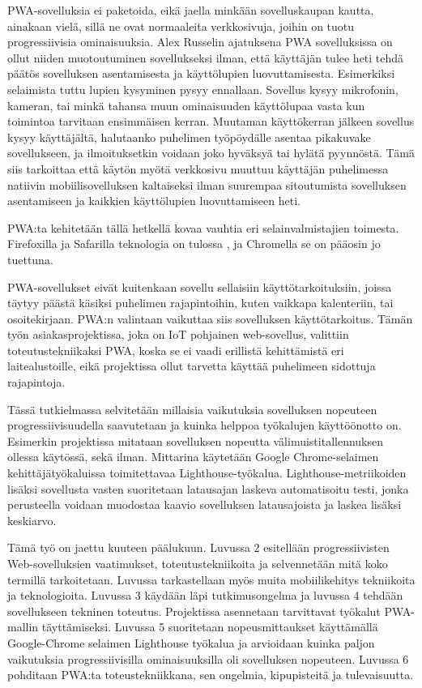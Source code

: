 \documentclass{tktltiki}
\begin{document}
PWA-sovelluksia ei paketoida, eikä jaella minkään sovelluskaupan kautta, ainakaan vielä, sillä ne ovat normaaleita verkkosivuja, joihin on tuotu progressiivisia ominaisuuksia. Alex  Russelin ajatuksena \cite{Russell} PWA sovelluksissa on ollut niiden muotoutuminen sovellukseksi ilman, että käyttäjän tulee heti tehdä päätös sovelluksen asentamisesta ja käyttölupien luovuttamisesta. Esimerkiksi selaimista tuttu lupien kysyminen pysyy ennallaan. Sovellus kysyy mikrofonin, kameran, tai minkä tahansa muun ominaisuuden käyttölupaa vasta kun toimintoa tarvitaan ensimmäisen kerran. Muutaman käyttökerran jälkeen sovellus kysyy käyttäjältä, halutaanko puhelimen työpöydälle asentaa pikakuvake sovellukseen, ja ilmoituksetkin voidaan joko hyväksyä tai hylätä pyynnöstä. Tämä siis tarkoittaa että käytön myötä verkkosivu muuttuu käyttäjän puhelimessa natiivin mobiilisovelluksen kaltaiseksi ilman suurempaa sitoutumista sovelluksen asentamiseen ja kaikkien käyttölupien luovuttamiseen heti. 

PWA:ta kehitetään tällä hetkellä kovaa vauhtia eri selainvalmistajien toimesta. Firefoxilla ja Safarilla teknologia on tulossa \cite{Santoni}, ja Chromella se on pääosin jo tuettuna. 

PWA-sovellukset eivät kuitenkaan sovellu sellaisiin käyttötarkoituksiin, joissa täytyy päästä käsiksi puhelimen rajapintoihin, kuten vaikkapa kalenteriin, tai osoitekirjaan. PWA:n valintaan vaikuttaa siis sovelluksen käyttötarkoitus. Tämän työn asiakasprojektissa, joka on IoT pohjainen web-sovellus, valittiin toteutustekniikaksi PWA, koska se ei vaadi erillistä kehittämistä eri laitealustoille, eikä projektissa ollut tarvetta käyttää puhelimeen sidottuja rajapintoja.

Tässä tutkielmassa selvitetään millaisia vaikutuksia sovelluksen nopeuteen progressiivisuudella saavutetaan ja kuinka helppoa työkalujen käyttöönotto on. Esimerkin projektissa mitataan sovelluksen nopeutta välimuistitallennuksen ollessa käytössä, sekä ilman. Mittarina käytetään Google Chrome-selaimen kehittäjätyökaluissa toimitettavaa Lighthouse-työkalua. Lighthouse-metriikoiden lisäksi sovellusta vasten suoritetaan latausajan laskeva automatisoitu testi, jonka perusteella voidaan muodostaa kaavio sovelluksen latausajoista ja laskea lisäksi keskiarvo. 

Tämä työ on jaettu kuuteen päälukuun. Luvussa 2 esitellään progressiivisten Web-sovelluksien vaatimukset, toteutustekniikoita ja selvennetään mitä koko termillä tarkoitetaan. Luvussa tarkastellaan myös muita mobiilikehitys tekniikoita ja teknologioita. Luvussa 3 käydään läpi tutkimusongelma ja luvussa 4 tehdään sovellukseen tekninen toteutus. Projektissa asennetaan tarvittavat työkalut PWA-mallin täyttämiseksi. Luvussa 5 suoritetaan nopeusmittaukset käyttämällä Google-Chrome selaimen Lighthouse työkalua ja arvioidaan kuinka paljon vaikutuksia progressiivisilla ominaisuuksilla oli sovelluksen nopeuteen. Luvussa 6 pohditaan PWA:ta toteustekniikkana, sen ongelmia, kipupisteitä ja tulevaisuutta.
\end{document}
